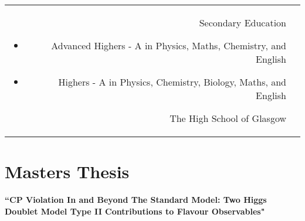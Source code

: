 \documentclass[10pt]{article} %
\begin{document}
\begin{paracol}{2}
\begin{supertabular}{rp{6.7cm}}

	{Secondary Education} %
	{} %
    {\vspace{-5pt}
     \begin{itemize}[noitemsep]
        \item Advanced Highers - A in Physics, Maths, Chemistry, and English
        \item Highers - A in Physics, Chemistry, Biology, Maths, and English
     \end{itemize}\vspace{-10pt}} %
     {The High School of Glasgow} %


\end{supertabular}



\section{Masters Thesis}

{\raggedright\textbf{``CP Violation In and Beyond The Standard Model: Two Higgs Doublet Model Type II Contributions to Flavour Observables"}\\\medskip}


\end{paracol}
\end{document}
